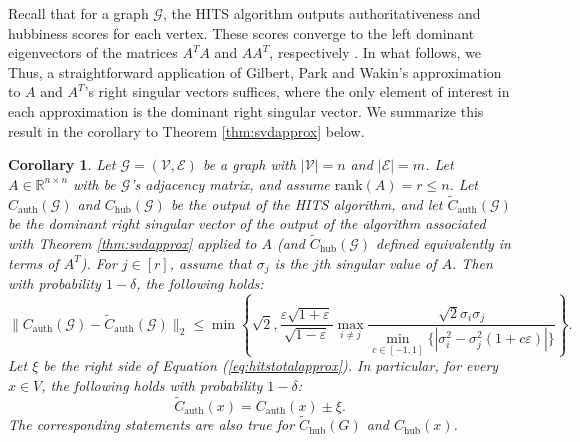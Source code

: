 \documentclass{report}
\newtheorem{corollary}[theorem]{Corollary}
\newcommand{\algoname}[1]{\textnormal{\textsc{#1}}}
\newcommand{\rank}{\mathrm{rank}}
\begin{document}
Recall that for a graph $\mathcal{G}$, the HITS algorithm outputs authoritativeness and hubbiness scores for each vertex. 
These scores converge to the left dominant eigenvectors of the matrices $A^TA$ and $AA^T$, respectively \cite{kleinberg1999authoritative}. 
In what follows, we
Thus, a straightforward application of Gilbert, Park and Wakin's approximation to $A$ and $A^T$'s right singular vectors suffices, where the only element of interest in each approximation is the dominant right singular vector.
We summarize this result in the corollary to Theorem \ref{thm:svdapprox} below.
%
\begin{corollary} \label{cor:hitsapprox}
Let $\mathcal{G} = (\mathcal{V}, \mathcal{E})$ be a graph with $|\mathcal{V}| = n$ and $|\mathcal{E}|=m$. 
Let $A \in \mathbb{R}^{n \times n}$ with be $\mathcal{G}$'s adjacency matrix, and assume $\rank(A) = r \leq n$. 
Let $C_\textrm{auth}(\mathcal{G})$ and $C_\textrm{hub}(\mathcal{G})$ be the output of the HITS algorithm, and let $\widetilde{C}_\textrm{auth}(\mathcal{G})$ be the dominant right singular vector of the output of the algorithm associated with Theorem \ref{thm:svdapprox} applied to $A$ (and $\widetilde{C}_\textrm{hub}(\mathcal{G})$ defined equivalently in terms of $A^T$).
%
%
For $j \in [r]$, assume that $\sigma_j$ is the $j$th singular value of $A$.
Then with probability $1-\delta$, the following holds:
%
\begin{equation} \label{eq:hitstotalapprox}
\|C_\textrm{auth}(\mathcal{G}) - \widetilde{C}_\textrm{auth}(\mathcal{G})\|_2 \leq
\min 
\left \{ 
\sqrt{2}, 
\frac{\varepsilon \sqrt{1+ \varepsilon}}{\sqrt{1-\varepsilon}}
\max\limits_{i\neq j}
\frac{\sqrt{2} \sigma_i \sigma_j}
{\min\limits_{c \in [-1,1]} \{| \sigma_i^2 - \sigma_j^2 (1 + c\varepsilon)|\}}
\right \}.
\end{equation}
%
%
Let $\xi$ be the right side of Equation (\ref{eq:hitstotalapprox}).
In particular, for every $x \in V$, the following holds with probability $1-\delta$:
%
\begin{equation} \label{eq:hitsapprox}
\widetilde{C}_\textrm{auth}(x) = C_\textrm{auth}(x) \pm \xi.
\end{equation}
%
The corresponding statements are also true for $\widetilde{C}_\textrm{hub}(G)$ and $C_\textrm{hub}(x)$.
\end{corollary}
\end{document}
